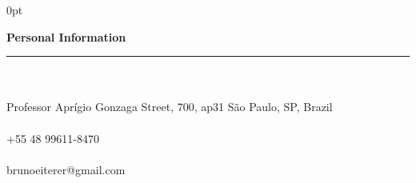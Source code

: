 \documentclass[a4paper]{article}
\begin{document}
\begin{adjustwidth}{\parindent}{0pt}
\begin{minipage}[t]{0.65\textwidth}
\end{minipage} \hspace{0.03\textwidth}
\begin{minipage}[t]{0.25\textwidth}
  \raggedright
  \Large{\textbf{Personal Information}} \normalsize \\ \rule{\textwidth}{0.5pt} \\ \hspace{0pt} \\
   \small{Professor Aprígio Gonzaga Street, 700, ap31 São Paulo, SP, Brazil} \\ \hspace{0pt} \\
   \small{+55 48 99611-8470} \\ \hspace{0pt} \\
  \small{brunoeiterer@gmail.com} \\ \hspace{0pt} \\

\end{minipage}
\end{adjustwidth}
\end{document}
